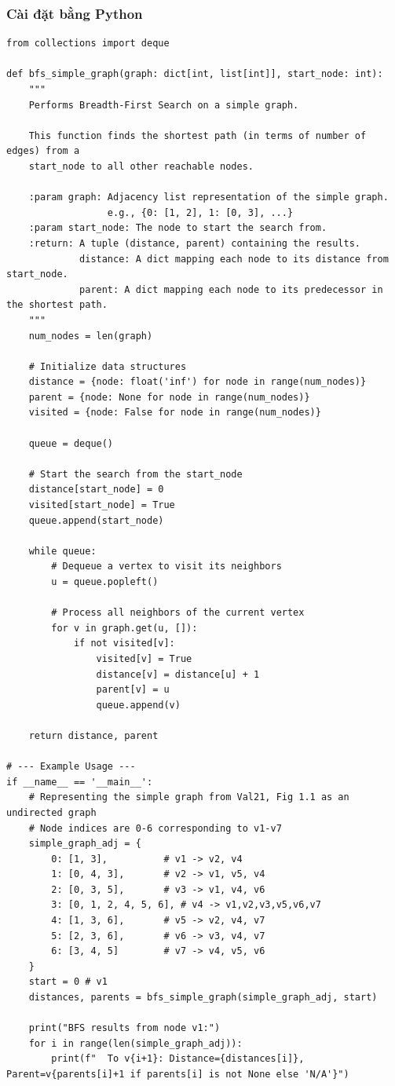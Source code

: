 \documentclass[a4paper,12pt]{article}
\begin{document}
\subsubsection{Cài đặt bằng Python}
\begin{lstlisting}[style=pythonstyle, caption={Cài đặt BFS cho đơn đồ thị trong Python.}, label={lst:python_bfs_8}]
from collections import deque

def bfs_simple_graph(graph: dict[int, list[int]], start_node: int):
    """
    Performs Breadth-First Search on a simple graph.
    
    This function finds the shortest path (in terms of number of edges) from a 
    start_node to all other reachable nodes.

    :param graph: Adjacency list representation of the simple graph.
                  e.g., {0: [1, 2], 1: [0, 3], ...}
    :param start_node: The node to start the search from.
    :return: A tuple (distance, parent) containing the results.
             distance: A dict mapping each node to its distance from start_node.
             parent: A dict mapping each node to its predecessor in the shortest path.
    """
    num_nodes = len(graph)
    
    # Initialize data structures
    distance = {node: float('inf') for node in range(num_nodes)}
    parent = {node: None for node in range(num_nodes)}
    visited = {node: False for node in range(num_nodes)}
    
    queue = deque()

    # Start the search from the start_node
    distance[start_node] = 0
    visited[start_node] = True
    queue.append(start_node)

    while queue:
        # Dequeue a vertex to visit its neighbors
        u = queue.popleft()

        # Process all neighbors of the current vertex
        for v in graph.get(u, []):
            if not visited[v]:
                visited[v] = True
                distance[v] = distance[u] + 1
                parent[v] = u
                queue.append(v)
                
    return distance, parent

# --- Example Usage ---
if __name__ == '__main__':
    # Representing the simple graph from Val21, Fig 1.1 as an undirected graph
    # Node indices are 0-6 corresponding to v1-v7
    simple_graph_adj = {
        0: [1, 3],          # v1 -> v2, v4
        1: [0, 4, 3],       # v2 -> v1, v5, v4
        2: [0, 3, 5],       # v3 -> v1, v4, v6
        3: [0, 1, 2, 4, 5, 6], # v4 -> v1,v2,v3,v5,v6,v7
        4: [1, 3, 6],       # v5 -> v2, v4, v7
        5: [2, 3, 6],       # v6 -> v3, v4, v7
        6: [3, 4, 5]        # v7 -> v4, v5, v6
    }
    start = 0 # v1
    distances, parents = bfs_simple_graph(simple_graph_adj, start)
    
    print("BFS results from node v1:")
    for i in range(len(simple_graph_adj)):
        print(f"  To v{i+1}: Distance={distances[i]}, Parent=v{parents[i]+1 if parents[i] is not None else 'N/A'}")
\end{lstlisting}
\end{document}
